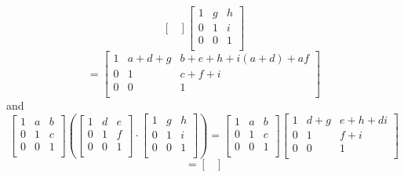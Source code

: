 \documentclass{article}
\begin{document}
\begin{enumerate}[label=\textbf{\alph*.}]
\[\begin{bmatrix}
            \end{bmatrix}
            \begin{bmatrix}
                1 & g & h \\
                0 & 1 & i \\
                0 & 0 & 1 \\
            \end{bmatrix} \]
            \[ = \begin{bmatrix}
                1 & a + d + g & b + e + h + i(a + d) + af \\
                0 & 1 & c + f + i \\
                0 & 0 & 1 \\
            \end{bmatrix} \]
            and
            \[\begin{bmatrix}
                1 & a & b \\
                0 & 1 & c \\
                0 & 0 & 1 \\
            \end{bmatrix}
            \left( \begin{bmatrix}
                1 & d & e \\
                0 & 1 & f \\
                0 & 0 & 1 \\
            \end{bmatrix} \cdot
            \begin{bmatrix}
                1 & g & h \\
                0 & 1 & i \\
                0 & 0 & 1 \\
            \end{bmatrix} \right) 
            = \begin{bmatrix}
                1 & a & b \\
                0 & 1 & c \\
                0 & 0 & 1 \\
            \end{bmatrix}
            \begin{bmatrix}
                1 & d + g & e + h + di \\
                0 & 1 & f + i \\
                0 & 0 & 1 \\
            \end{bmatrix} \]
            \[ = \begin{bmatrix}

\end{bmatrix}\]
\end{enumerate}
\end{document}

